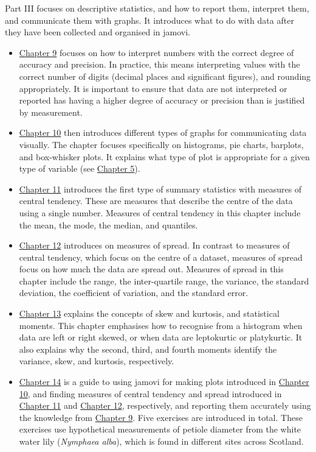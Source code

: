 \documentclass[
  openany]{scrbook}
\begin{document}
Part III focuses on descriptive statistics, and how to report them, interpret them, and communicate them with graphs.
It introduces what to do with data after they have been collected and organised in jamovi.

\begin{itemize}
\item
  \protect\hyperlink{Chapter_9}{Chapter 9} focuses on how to interpret numbers with the correct degree of accuracy and precision.
  In practice, this means interpreting values with the correct number of digits (decimal places and significant figures), and rounding appropriately.
  It is important to ensure that data are not interpreted or reported has having a higher degree of accuracy or precision than is justified by measurement.
\item
  \protect\hyperlink{Chapter_10}{Chapter 10} then introduces different types of graphs for communicating data visually.
  The chapter focuses specifically on histograms, pie charts, barplots, and box-whisker plots.
  It explains what type of plot is appropriate for a given type of variable (see \protect\hyperlink{Chapter_5}{Chapter 5}).
\item
  \protect\hyperlink{Chapter_11}{Chapter 11} introduces the first type of summary statistics with measures of central tendency.
  These are measures that describe the centre of the data using a single number.
  Measures of central tendency in this chapter include the mean, the mode, the median, and quantiles.
\item
  \protect\hyperlink{Chapter_12}{Chapter 12} introduces on measures of spread.
  In contrast to measures of central tendency, which focus on the centre of a dataset, measures of spread focus on how much the data are spread out.
  Measures of spread in this chapter include the range, the inter-quartile range, the variance, the standard deviation, the coefficient of variation, and the standard error.
\item
  \protect\hyperlink{Chapter_13}{Chapter 13} explains the concepts of skew and kurtosis, and statistical moments.
  This chapter emphasises how to recognise from a histogram when data are left or right skewed, or when data are leptokurtic or platykurtic.
  It also explains why the second, third, and fourth moments identify the variance, skew, and kurtosis, respectively.
\item
  \protect\hyperlink{Chapter_14}{Chapter 14} is a guide to using jamovi for making plots introduced in \protect\hyperlink{Chapter_10}{Chapter 10}, and finding measures of central tendency and spread introduced in \protect\hyperlink{Chapter_11}{Chapter 11} and \protect\hyperlink{Chapter_12}{Chapter 12}, respectively, and reporting them accurately using the knowledge from \protect\hyperlink{Chapter_9}{Chapter 9}.
  Five exercises are introduced in total.
  These exercises use hypothetical measurements of petiole diameter from the white water lily (\emph{Nymphaea alba}), which is found in different sites across Scotland.
\end{itemize}
\end{document}

